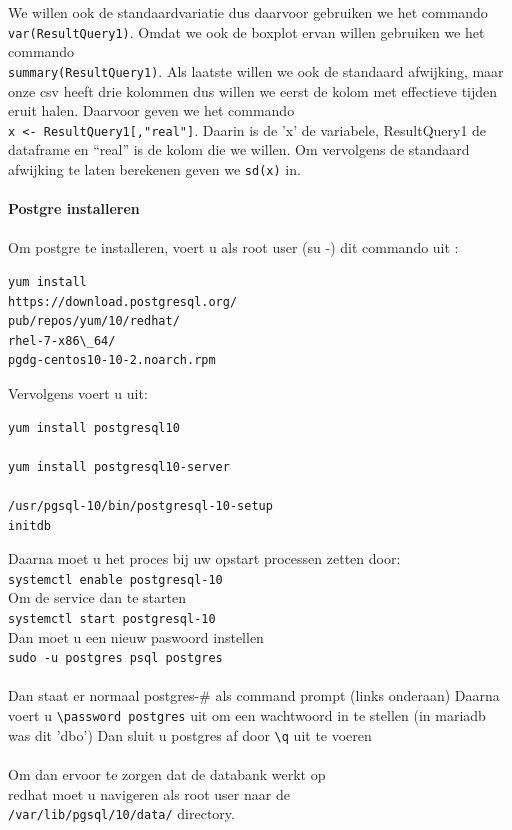 \documentclass[fleqn,10pt]{artikeltin}
\begin{document}
We willen ook de standaardvariatie dus daarvoor gebruiken we het commando \verb|var(ResultQuery1)|.
Omdat we ook de boxplot ervan willen gebruiken we het commando \\\verb|summary(ResultQuery1)|.
Als laatste willen we ook de standaard afwijking, maar onze csv heeft drie kolommen dus willen we eerst de kolom met effectieve tijden eruit halen. Daarvoor geven we het commando \\\verb|x <- ResultQuery1[,"real"]|. Daarin is de 'x' de variabele, ResultQuery1 de dataframe en ``real'' is de kolom die we willen.
Om vervolgens de standaard afwijking te laten berekenen geven we \verb|sd(x)| in.\\\\
\textbf{Postgre installeren}\\\\
Om postgre te installeren, voert u als root user (su -) dit commando uit :\\
\begin{lstlisting}
yum install
https://download.postgresql.org/
pub/repos/yum/10/redhat/
rhel-7-x86\_64/
pgdg-centos10-10-2.noarch.rpm
\end{lstlisting}
Vervolgens voert u uit:
\begin{lstlisting}
yum install postgresql10

yum install postgresql10-server

/usr/pgsql-10/bin/postgresql-10-setup
initdb
\end{lstlisting}
Daarna moet u het proces bij uw opstart processen zetten door:\\
 \verb|systemctl enable postgresql-10|\\
Om de service dan te starten\\
 \verb|systemctl start postgresql-10|\\
Dan moet u een nieuw paswoord instellen \\
 \verb|sudo -u postgres psql postgres|\\\\
Dan staat er normaal postgres-\# als command prompt (links onderaan)
Daarna voert u \verb|\password postgres| uit om een wachtwoord in te stellen (in mariadb was dit 'dbo')
Dan sluit u postgres af door \verb|\q| uit te voeren\\\\
Om dan ervoor te zorgen dat de databank werkt op \\redhat moet u navigeren als root user naar de \\
\verb|/var/lib/pgsql/10/data/| directory.
\end{document}
